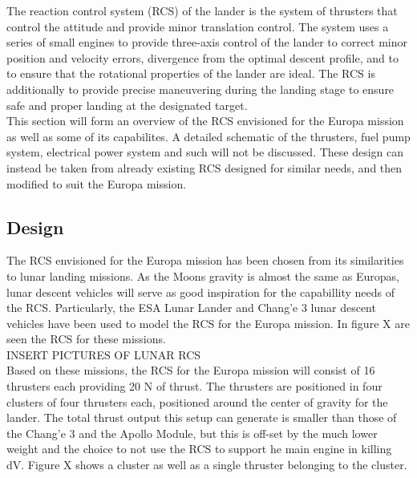 \label{chap:RCS}

The reaction control system (RCS) of the lander is the system of thrusters that control the attitude and provide minor translation control. The system uses a series of small engines to provide three-axis control of the lander to correct minor position and velocity errors, divergence from the optimal descent profile, and to to ensure that the rotational properties of the lander are ideal. The RCS is additionally to provide precise maneuvering during the landing stage to ensure safe and proper landing at the designated target.\\

This section will form an overview of the RCS envisioned for the Europa mission as well as some of its capabilites. A detailed schematic of the thrusters, fuel pump system, electrical power system and such will not be discussed. These design can instead be taken from already existing RCS designed for similar needs, and then modified to suit the Europa mission.\\

\subsection{Design}

The RCS envisioned for the Europa mission has been chosen from its similarities to lunar landing missions. As the Moons gravity is almost the same as Europas, lunar descent vehicles  will serve as good inspiration for the capabillity needs of the RCS. Particularly, the ESA Lunar Lander and Chang'e 3 lunar descent vehicles have been used to model the RCS for the Europa mission. In figure X are seen the RCS for these missions.\\


					INSERT PICTURES OF LUNAR RCS\\


Based on these missions, the RCS for the Europa mission will consist of 16 thrusters each providing 20 N of thrust. The thrusters are positioned in four clusters of four thrusters each, positioned around the center of gravity for the lander. The total thrust output this setup can generate is smaller than those of the Chang'e 3 and the Apollo Module, but this is off-set  by the much lower weight and the choice to not use the RCS to support he main engine in killing dV. Figure X shows a cluster as well as a single thruster belonging to the cluster.\\

